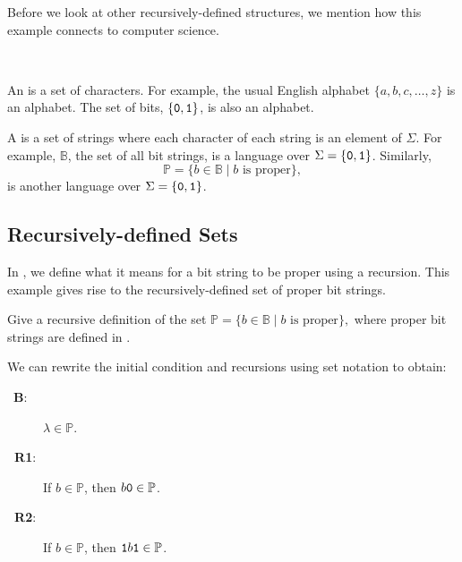 Before we look at other recursively-defined structures, we mention how this example connects to computer science.

\begin{defn}[Language]
\label{defn_language}
~
    \begin{apart}
        \item An  is a set of characters. For example, the usual English alphabet $\{a,b,c, \ldots, z\}$ is an alphabet. The set of bits, $\{\texttt{0}, \texttt{1}\}$, is also an alphabet. 
        \item A  is a set of strings where each character of each string is an element of $\Sigma$.  For example, $\mathbb{B}$, the set of all bit strings, is a language over $\Sigma = \{\texttt{0}, \texttt{1}\}$.  Similarly, $$\mathbb{P} = \{ b \in \mathbb{B} \mid b \text{ is proper}\},$$ is another language over $\Sigma = \{\texttt{0}, \texttt{1}\}$.
    \end{apart}
\end{defn}


\newcommand{\subrecsets}{Recursively-defined Sets}
\subsection{\subrecsets}
\label{sub_rec_def_sets}

In , we define what it means for a bit string to be proper using a recursion. This example gives rise to the recursively-defined set of proper bit strings.

\begin{exam}
\label{exam_rec_def_set_proper_bs}
    Give a recursive definition of the set
        $\mathbb{P} = \{ b \in \mathbb{B} \mid b \text{ is proper}\},$
    where proper bit strings are defined in .
            \begin{soln}
                We can rewrite the initial condition and recursions using set notation to obtain:
                    \begin{description} 
                        \item [~\quad \textbf{B}:] $\lambda \in \mathbb{P}$.
                        \item [\textbf{~\quad R1}:] If $b \in \mathbb{P}$, then $b\texttt{0}\in \mathbb{P}$. 
                        \item [\textbf{~\quad R2}:] If $b \in \mathbb{P}$, then $\texttt{1}b\texttt{1}\in \mathbb{P}$.
                    \end{description} 
            \end{soln}
\end{exam}

